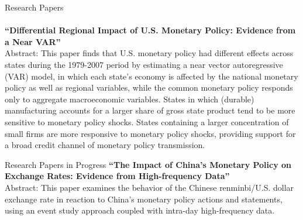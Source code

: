 \documentclass{resume_liang} %
\begin{document}
\begin{rSection}{Research Papers}
\\
\\
\textbf{``Differential Regional Impact of U.S. Monetary Policy: Evidence from a Near VAR''} \\
Abstract: This paper finds that U.S. monetary policy had different effects across states during the 1979-2007 period by estimating a near vector autoregressive (VAR) model, in which each state's economy is affected by the national monetary policy as well as regional variables, while the common monetary policy responds only to aggregate macroeconomic variables. States in which (durable) manufacturing accounts for a larger share of gross state product tend to be more sensitive to monetary policy shocks. States containing a larger concentration of small firms are more responsive to monetary policy shocks, providing support for a broad credit channel of monetary policy transmission.
\\

\end{rSection}
\bigskip \bigskip




\begin{rSection}{Research Papers in Progress}
\textbf{``The Impact of China's Monetary Policy on Exchange Rates: Evidence from High-frequency Data''}\\
Abstract: This paper examines the behavior of the Chinese renminbi/U.S. dollar exchange rate in reaction to China's monetary policy actions and statements, using an event study approach coupled with intra-day high-frequency data.

\end{rSection}
\bigskip \bigskip
\end{document}
